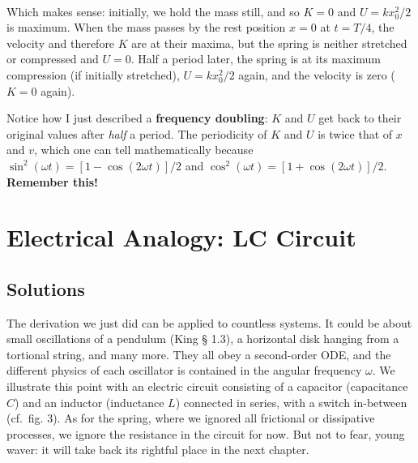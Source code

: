 \documentclass[11pt]{article}
\begin{document}
    \begin{center}
    \end{center}
    { \hspace*{\fill} \\}
    
    Which makes sense: initially, we hold the mass still, and so \(K=0\) and
\(U = kx_0^2/2\) is maximum. When the mass passes by the rest position
\(x=0\) at \(t=T/4\), the velocity and therefore \(K\) are at their
maxima, but the spring is neither stretched or compressed and \(U=0\).
Half a period later, the spring is at its maximum compression (if
initially stretched), \(U = kx_0^2/2\) again, and the velocity is zero
(\(K=0\) again).

Notice how I just described a \textbf{frequency doubling}: \(K\) and
\(U\) get back to their original values after \emph{half} a period. The
periodicity of \(K\) and \(U\) is twice that of \(x\) and \(v\), which
one can tell mathematically because
\(\sin^2(\omega t) = [1 - \cos(2\omega t)]/2\) and
\(\cos^2(\omega t) = [1 + \cos(2\omega t)]/2\). \textbf{Remember this!}

    \hypertarget{electrical-analogy-lc-circuit}{%
\section{Electrical Analogy: LC
Circuit}\label{electrical-analogy-lc-circuit}}

    \hypertarget{solutions}{%
\subsection{Solutions}\label{solutions}}

    The derivation we just did can be applied to countless systems. It could
be about small oscillations of a pendulum (King § 1.3), a horizontal
disk hanging from a tortional string, and many more. They all obey a
second-order ODE, and the different physics of each oscillator is
contained in the angular frequency \(\omega\). We illustrate this point
with an electric circuit consisting of a capacitor (capacitance \(C\))
and an inductor (inductance \(L\)) connected in series, with a switch
in-between (cf.~fig. 3). As for the spring, where we ignored all
frictional or dissipative processes, we ignore the resistance in the
circuit for now. But not to fear, young waver: it will take back its
rightful place in the next chapter.
\end{document}
